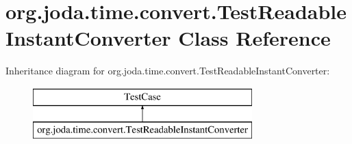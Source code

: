 \hypertarget{classorg_1_1joda_1_1time_1_1convert_1_1_test_readable_instant_converter}{\section{org.\-joda.\-time.\-convert.\-Test\-Readable\-Instant\-Converter Class Reference}
\label{classorg_1_1joda_1_1time_1_1convert_1_1_test_readable_instant_converter}
}
Inheritance diagram for org.\-joda.\-time.\-convert.\-Test\-Readable\-Instant\-Converter\-:\begin{figure}[H]
\begin{center}
\leavevmode
\includegraphics[height=2.000000cm]{classorg_1_1joda_1_1time_1_1convert_1_1_test_readable_instant_converter}
\end{center}
\end{figure}
